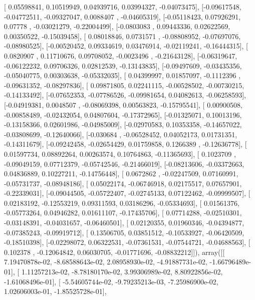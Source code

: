 \documentclass{article}
\begin{document}
       [ 0.05598841,  0.10519949,  0.04939716,  0.03994327, -0.04073475],
       [-0.09617548, -0.04772511, -0.09327047,  0.0088407 , -0.04605319],
       [-0.05118423,  0.07926291,  0.07778   , -0.03021279, -0.22004499],
       [-0.0803083 ,  0.09443336,  0.02622569,  0.00350522, -0.15039458],
       [ 0.08018846,  0.0731571 , -0.08808952, -0.07697076, -0.08980525],
       [-0.00520452,  0.09334619,  0.03476914, -0.02119241, -0.16444315],
       [ 0.0820907 ,  0.11710676,  0.09708052, -0.0023496 , -0.21643128],
       [-0.06319647, -0.06122232,  0.09706326,  0.02812539, -0.13143835],
       [-0.09497609, -0.03435356, -0.05040775,  0.00303638, -0.05332035],
       [ 0.04399997,  0.01857097, -0.1112396 , -0.09631352, -0.08297836],
       [ 0.09871805,  0.02241115, -0.00528502, -0.00730215, -0.14133492],
       [-0.07652353, -0.07786526, -0.09981654,  0.04082613, -0.06258593],
       [-0.04919381,  0.0048507 , -0.08069398,  0.00563823, -0.15795541],
       [ 0.00900508, -0.00858489, -0.02432054,  0.04807604, -0.17372965],
       [-0.01325071,  0.10013196, -0.13158366,  0.02601986, -0.04985009],
       [-0.02970583,  0.10353358, -0.14657022, -0.03808699, -0.12640066],
       [-0.030684  , -0.06528452,  0.04052173,  0.01731351, -0.14311679],
       [-0.09242458, -0.02654429,  0.01759858,  0.1266389 , -0.12636778],
       [ 0.01597734,  0.08892264,  0.00263574,  0.10764863, -0.11365693],
       [ 0.1023709 , -0.09049159,  0.07712379, -0.05742546, -0.21466019],
       [-0.08213606, -0.03372663,  0.04836889,  0.10227211, -0.14756448],
       [ 0.0672862 , -0.02247509,  0.07160991, -0.05731737, -0.08948186],
       [ 0.05022174, -0.06746918,  0.02175517,  0.07657901, -0.22339031],
       [-0.09044505, -0.05722407, -0.02745133,  0.07122462, -0.09999507],
       [ 0.02183192, -0.12553219,  0.09311593,  0.03186296, -0.05334693],
       [ 0.01561376, -0.05773264,  0.04946282,  0.01611107, -0.17435706],
       [ 0.07714288, -0.02510301, -0.03148391, -0.04031657, -0.06460501],
       [ 0.02120355,  0.01960346, -0.04394877, -0.07385243, -0.09919712],
       [ 0.13506705,  0.03851512, -0.10533927, -0.06420509, -0.18510398],
       [-0.02298072,  0.06322531, -0.07361531, -0.07544721, -0.04688563],
       [ 0.102378  , -0.12064842,  0.06030705, -0.01771696, -0.08832212]]), array([[  7.19470878e-02,  -8.68588643e-02,   2.08958930e-02,
         -4.91887731e-02,  -1.66796489e-01],
       [  1.11257213e-02,  -8.78180170e-02,   3.99306989e-02,
          8.80922856e-02,  -1.61068496e-01],
       [ -5.54605744e-02,  -9.79235213e-03,  -7.25986900e-02,
          1.02606003e-01,  -1.85525728e-01],
\end{document}
